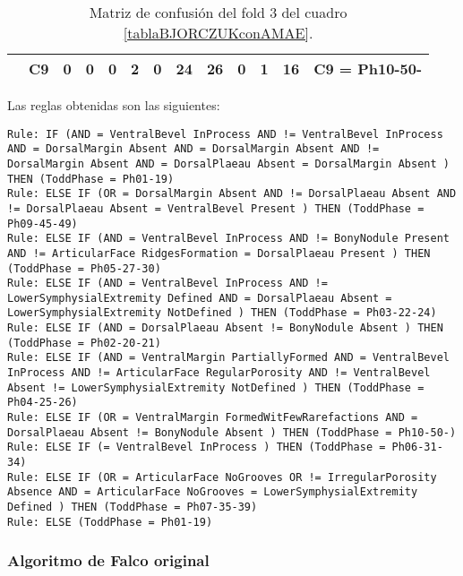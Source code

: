 \begin{table}[H]
{\begin{tabular}{|ccccccccccccc|}
\multicolumn{1}{|c|}{}                                      & \multicolumn{1}{c|}{C9} & \multicolumn{1}{c|}{0}  & \multicolumn{1}{c|}{0}  & \multicolumn{1}{c|}{0}  & \multicolumn{1}{c|}{\textbf{2}}  & \multicolumn{1}{c|}{0}  & \multicolumn{1}{c|}{\textbf{24}} & \multicolumn{1}{c|}{\textbf{26}} & \multicolumn{1}{c|}{0}  & \multicolumn{1}{c|}{\textbf{1}}  & \multicolumn{1}{c|}{\textbf{16}} & C9 = Ph10-50-     \\ \hline
\end{tabular}%
}
\caption{Matriz de confusión del fold 3 del cuadro \ref{tablaBJORCZUKconAMAE}.}
\end{table}


Las reglas obtenidas son las siguientes:

\begin{lstlisting}
Rule: IF (AND = VentralBevel InProcess AND != VentralBevel InProcess AND = DorsalMargin Absent AND = DorsalMargin Absent AND != DorsalMargin Absent AND = DorsalPlaeau Absent = DorsalMargin Absent ) THEN (ToddPhase = Ph01-19)
Rule: ELSE IF (OR = DorsalMargin Absent AND != DorsalPlaeau Absent AND != DorsalPlaeau Absent = VentralBevel Present ) THEN (ToddPhase = Ph09-45-49)
Rule: ELSE IF (AND = VentralBevel InProcess AND != BonyNodule Present AND != ArticularFace RidgesFormation = DorsalPlaeau Present ) THEN (ToddPhase = Ph05-27-30)
Rule: ELSE IF (AND = VentralBevel InProcess AND != LowerSymphysialExtremity Defined AND = DorsalPlaeau Absent = LowerSymphysialExtremity NotDefined ) THEN (ToddPhase = Ph03-22-24)
Rule: ELSE IF (AND = DorsalPlaeau Absent != BonyNodule Absent ) THEN (ToddPhase = Ph02-20-21)
Rule: ELSE IF (AND = VentralMargin PartiallyFormed AND = VentralBevel InProcess AND != ArticularFace RegularPorosity AND != VentralBevel Absent != LowerSymphysialExtremity NotDefined ) THEN (ToddPhase = Ph04-25-26)
Rule: ELSE IF (OR = VentralMargin FormedWitFewRarefactions AND = DorsalPlaeau Absent != BonyNodule Absent ) THEN (ToddPhase = Ph10-50-)
Rule: ELSE IF (= VentralBevel InProcess ) THEN (ToddPhase = Ph06-31-34)
Rule: ELSE IF (OR = ArticularFace NoGrooves OR != IrregularPorosity Absence AND = ArticularFace NoGrooves = LowerSymphysialExtremity Defined ) THEN (ToddPhase = Ph07-35-39)
Rule: ELSE (ToddPhase = Ph01-19)
\end{lstlisting}


\newpage

\subsubsection{Algoritmo de Falco original}

